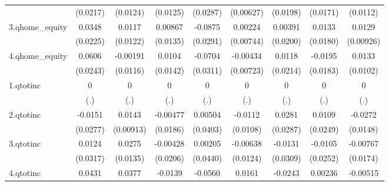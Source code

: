 {\begin{tabular}{l*{8}{c}}
            &    (0.0217)         &    (0.0124)         &    (0.0125)         &    (0.0287)         &   (0.00627)         &    (0.0198)         &    (0.0171)         &    (0.0112)         \\
[1em]
3.qhome\_equity&      0.0348         &      0.0117         &     0.00867         &     -0.0875\sym{**} &     0.00224         &     0.00391         &      0.0133         &      0.0129         \\
            &    (0.0225)         &    (0.0122)         &    (0.0135)         &    (0.0291)         &   (0.00744)         &    (0.0200)         &    (0.0180)         &   (0.00926)         \\
[1em]
4.qhome\_equity&      0.0606\sym{*}  &    -0.00191         &      0.0104         &     -0.0704\sym{*}  &    -0.00434         &      0.0118         &     -0.0195         &      0.0133         \\
            &    (0.0243)         &    (0.0116)         &    (0.0142)         &    (0.0311)         &   (0.00723)         &    (0.0214)         &    (0.0183)         &    (0.0102)         \\
[1em]
1.qtotinc   &           0         &           0         &           0         &           0         &           0         &           0         &           0         &           0         \\
            &         (.)         &         (.)         &         (.)         &         (.)         &         (.)         &         (.)         &         (.)         &         (.)         \\
[1em]
2.qtotinc   &     -0.0151         &      0.0143         &    -0.00477         &     0.00504         &     -0.0112         &      0.0281         &      0.0109         &     -0.0272         \\
            &    (0.0277)         &   (0.00913)         &    (0.0186)         &    (0.0403)         &    (0.0108)         &    (0.0287)         &    (0.0249)         &    (0.0148)         \\
[1em]
3.qtotinc   &      0.0124         &      0.0275\sym{*}  &    -0.00428         &     0.00205         &    -0.00638         &     -0.0131         &     -0.0105         &    -0.00767         \\
            &    (0.0317)         &    (0.0135)         &    (0.0206)         &    (0.0440)         &    (0.0124)         &    (0.0309)         &    (0.0252)         &    (0.0174)         \\
[1em]
4.qtotinc   &      0.0431         &      0.0377\sym{**} &     -0.0139         &     -0.0560         &      0.0161         &     -0.0243         &     0.00236         &    -0.00515         \\

\end{tabular}}

